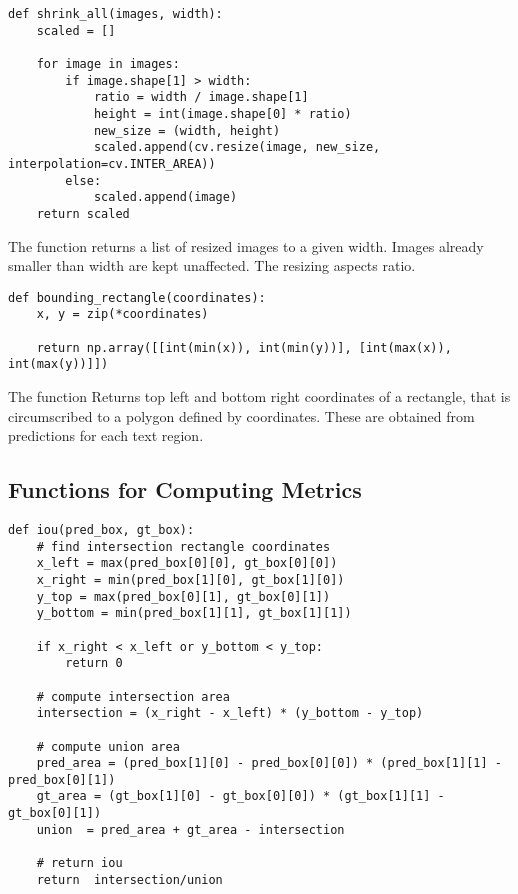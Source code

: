 \begin{lstlisting}[caption=shrink\_all]
def shrink_all(images, width):
    scaled = []
    
    for image in images:
        if image.shape[1] > width:
            ratio = width / image.shape[1]
            height = int(image.shape[0] * ratio)
            new_size = (width, height)  
            scaled.append(cv.resize(image, new_size, interpolation=cv.INTER_AREA))
        else:
            scaled.append(image)
    return scaled    
\end{lstlisting}

The function  returns a list of resized images to a given width. Images already smaller than width are kept unaffected. The resizing aspects ratio.



\begin{lstlisting}[caption=bounding\_rectangle]
def bounding_rectangle(coordinates):
    x, y = zip(*coordinates)

    return np.array([[int(min(x)), int(min(y))], [int(max(x)), int(max(y))]])
\end{lstlisting}

The function 
Returns top left and bottom right coordinates of a rectangle, that is circumscribed to a polygon defined by coordinates. These are obtained from predictions for each text region.

\subsection*{Functions for Computing Metrics}


\begin{lstlisting}[caption=iou]
def iou(pred_box, gt_box):
    # find intersection rectangle coordinates
    x_left = max(pred_box[0][0], gt_box[0][0])
    x_right = min(pred_box[1][0], gt_box[1][0])
    y_top = max(pred_box[0][1], gt_box[0][1])
    y_bottom = min(pred_box[1][1], gt_box[1][1])

    if x_right < x_left or y_bottom < y_top:
        return 0
    
    # compute intersection area
    intersection = (x_right - x_left) * (y_bottom - y_top)

    # compute union area
    pred_area = (pred_box[1][0] - pred_box[0][0]) * (pred_box[1][1] - pred_box[0][1]) 
    gt_area = (gt_box[1][0] - gt_box[0][0]) * (gt_box[1][1] - gt_box[0][1]) 
    union  = pred_area + gt_area - intersection

    # return iou
    return  intersection/union

\end{lstlisting}

